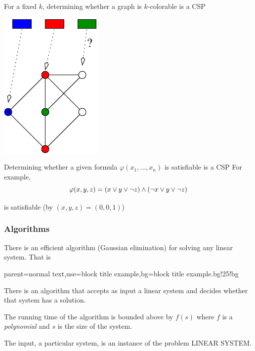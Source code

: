 \documentclass[12pt,xcolor=dvipsnames%
   ]{beamer}
\renewcommand{\.}{\cdot}
\renewcommand{\phi}{\ensuremath{\varphi}}
\begin{document}
\begin{frame}
  For a fixed $k$, determining whether a graph is $k$-colorable is a CSP
  \begin{center}
    \includegraphics{../inputs/k-col}
  \end{center}
\end{frame}


\begin{frame}
Determining whether a given formula $\phi(x_1,\dots,x_n)$ is satisfiable is a CSP
\bigskip
For example,
\begin{equation*}
\phi(x,y,z) = (x\join y \join \neg z) \meet (\neg x\join y \join \neg z)
\end{equation*}

\bigskip

is satisfiable (by $(x,y,z) = (0,0,1)$)
\end{frame}

\begin{frame}
  \frametitle{Algorithms}
  There is an efficient algorithm (Gaussian elimination) for solving any
  linear system.
  That is

%
{parent=normal text,use=block title example,bg=block title example.bg!25!bg}
  \begin{exampleblock}{}
    There is an algorithm that accepts as input a linear system
    and decides whether that system has a solution.

    \smallskip
    The running time of the algorithm is bounded above by $f(s)$ where
    $f$ is a \emph{polynomial} and $s$ is the size of the system.
  \end{exampleblock}
  \pause

  The \alert{input}, a particular system, is an \alert{instance} of the \alert{problem}
  LINEAR SYSTEM.
  
\end{frame}
\end{document}
